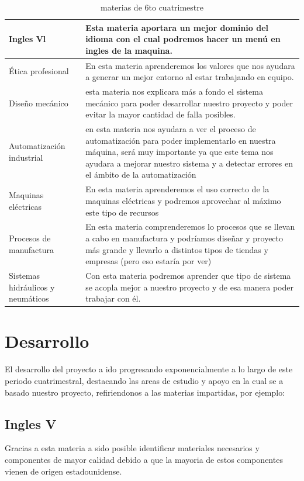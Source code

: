 \documentclass[12pt,a4paper]{article}
\begin{document}
\begin{table}[H]
\centering
\begin{tabular}{|m{4cm}|m{11cm}|}

\hline
Ingles Vl & Esta materia aportara un mejor dominio del idioma con el cual podremos hacer un menú en ingles de la maquina.\\
\hline 
Ética profesional & En esta materia aprenderemos los valores que nos ayudara a generar un mejor entorno al estar trabajando en equipo. \\
\hline
Diseño mecánico & esta materia nos explicara más a fondo el sistema mecánico para poder desarrollar nuestro proyecto y poder evitar la mayor cantidad de falla posibles. \\
\hline
Automatización industrial & en esta materia nos ayudara a ver el proceso de automatización para poder implementarlo en nuestra máquina, será muy importante ya que este tema nos ayudara a mejorar nuestro sistema y a detectar errores en el ámbito de la automatización \\
\hline
Maquinas eléctricas & En esta materia aprenderemos el uso correcto de la maquinas eléctricas y podremos aprovechar al máximo este tipo de recursos \\
\hline
Procesos de manufactura & En esta materia comprenderemos lo procesos que se llevan a cabo en manufactura y podríamos diseñar y proyecto más grande y llevarlo a distintos tipos de tiendas y empresas (pero eso estaría por ver)\\
\hline
Sistemas hidráulicos y neumáticos & Con esta materia podremos aprender que tipo de sistema se acopla mejor a nuestro proyecto y de esa manera poder trabajar con él.\\
\hline 

\end{tabular}
\caption{materias de 6to cuatrimestre}
\label{lineas}
\end{table}

\section{Desarrollo}
El desarrollo del proyecto a ido progresando exponencialmente a lo largo de este periodo cuatrimestral, destacando las areas de estudio y apoyo en la cual se a basado nuestro proyecto, refiriendonos a las materias impartidas, por ejemplo:

\subsection{Ingles V}
Gracias a esta materia a sido posible identificar materiales necesarios y componentes de mayor calidad debido a que la mayoria de estos componentes vienen de origen estadounidense.
\end{document}
